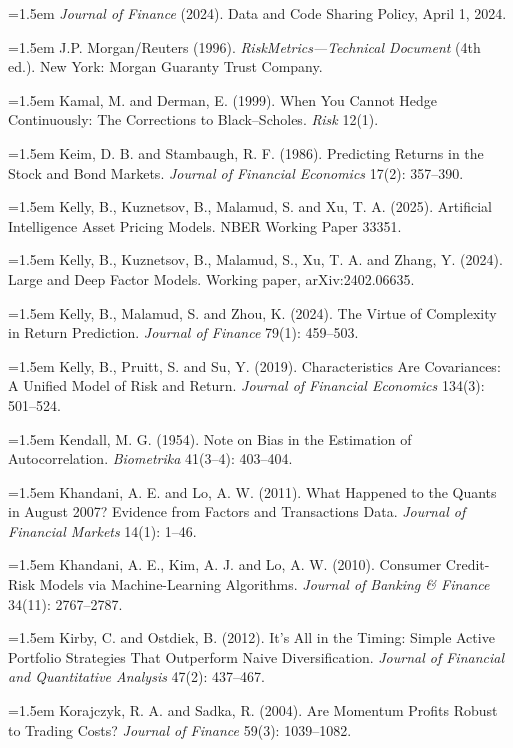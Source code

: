 \hangindent=1.5em \emph{Journal of Finance} (2024). Data and Code Sharing Policy, April 1, 2024.

\hangindent=1.5em J.P. Morgan/Reuters (1996). \emph{RiskMetrics---Technical Document} (4th ed.). New York: Morgan Guaranty Trust Company.

\hangindent=1.5em Kamal, M. and Derman, E. (1999). When You Cannot Hedge Continuously: The Corrections to Black--Scholes. \emph{Risk} 12(1).

\hangindent=1.5em Keim, D. B. and Stambaugh, R. F. (1986). Predicting Returns in the Stock and Bond Markets. \emph{Journal of Financial Economics} 17(2): 357--390.

\hangindent=1.5em Kelly, B., Kuznetsov, B., Malamud, S. and Xu, T. A. (2025). Artificial Intelligence Asset Pricing Models. NBER Working Paper 33351.

\hangindent=1.5em Kelly, B., Kuznetsov, B., Malamud, S., Xu, T. A. and Zhang, Y. (2024). Large and Deep Factor Models. Working paper, arXiv:2402.06635.

\hangindent=1.5em Kelly, B., Malamud, S. and Zhou, K. (2024). The Virtue of Complexity in Return Prediction. \emph{Journal of Finance} 79(1): 459--503.

\hangindent=1.5em Kelly, B., Pruitt, S. and Su, Y. (2019). Characteristics Are Covariances: A Unified Model of Risk and Return. \emph{Journal of Financial Economics} 134(3): 501--524.

\hangindent=1.5em Kendall, M. G. (1954). Note on Bias in the Estimation of Autocorrelation. \emph{Biometrika} 41(3--4): 403--404.

\hangindent=1.5em Khandani, A. E. and Lo, A. W. (2011). What Happened to the Quants in August 2007? Evidence from Factors and Transactions Data. \emph{Journal of Financial Markets} 14(1): 1--46.

\hangindent=1.5em Khandani, A. E., Kim, A. J. and Lo, A. W. (2010). Consumer Credit-Risk Models via Machine-Learning Algorithms. \emph{Journal of Banking \& Finance} 34(11): 2767--2787.

\hangindent=1.5em Kirby, C. and Ostdiek, B. (2012). It's All in the Timing: Simple Active Portfolio Strategies That Outperform Naive Diversification. \emph{Journal of Financial and Quantitative Analysis} 47(2): 437--467.

\hangindent=1.5em Korajczyk, R. A. and Sadka, R. (2004). Are Momentum Profits Robust to Trading Costs? \emph{Journal of Finance} 59(3): 1039--1082.

